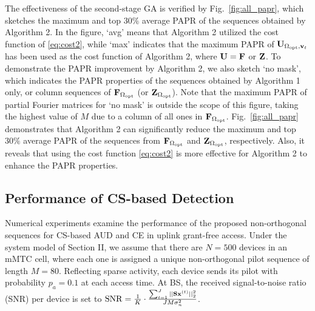 \documentclass[journal]{IEEEtran}
\newcommand{\vbu}{{\bf v}}
\newcommand{\xbu}{{\bf x}}
\newcommand{\Fbu}{{\bf F}}
\newcommand{\Sbu}{{\bf S}}
\newcommand{\Ubu}{{\bf U}}
\newcommand{\Zbu}{{\bf Z}}
\numberwithin{const2}{const}
\begin{document}
The effectiveness of the second-stage GA is verified by 
Fig.~\ref{fig:all_papr}, which sketches the maximum and top $ 30 \%$ average PAPR of the sequences
obtained by Algorithm 2. %
In the figure, `avg' means that Algorithm 2 utilized 
the cost function of \eqref{eq:cost2},
while `max' indicates that the maximum PAPR of $\Ubu_{\Omega_{\rm opt}, \vbu_t}$
has been used as the cost function of Algorithm 2, where $\Ubu = \Fbu$ or $\Zbu$.
To demonstrate the PAPR improvement by Algorithm 2, 
we also sketch `no mask', which indicates the PAPR properties %
of the sequences obtained by Algorithm 1 only, or column sequences of $\Fbu_{\Omega_{\rm opt}}$
(or $\Zbu_{\Omega_{\rm opt}}$).
Note that the maximum PAPR of partial Fourier matrices %
for `no mask' is 
outside the scope of this figure, taking the highest value of $M$ %
due to a column of all ones in $\Fbu_{\Omega_{\rm opt}}$.
Fig.~\ref{fig:all_papr} demonstrates that Algorithm 2 can significantly 
reduce the %
maximum and top $30 \%$ average PAPR of 
the sequences from $\Fbu_{\Omega_{\rm opt}}$ and 
$\Zbu_{\Omega_{\rm opt}}$, respectively. 
Also, it 
reveals that using the cost function \eqref{eq:cost2} %
is more effective for Algorithm 2 to enhance the %
PAPR properties. %





\subsection{Performance of CS-based Detection}

Numerical experiments examine the performance of the proposed non-orthogonal sequences
for CS-based AUD and CE in uplink grant-free access.
Under the system model of Section II,
we assume that there are $N = 500$ devices in an mMTC cell,
where each one is assigned a unique non-orthogonal pilot sequence of length $M=80$. %
Reflecting sparse activity, each device sends its pilot with probability $p_a=0.1$
at each access time.
At BS, 
the received signal-to-noise ratio (SNR) per device is set to 
${\rm SNR} = \frac{1}{K} \cdot \frac{\sum_{t=1} ^J|| \Sbu \xbu^{(t)} ||_2 ^2}{J M \sigma_n ^2}$.
\end{document}
